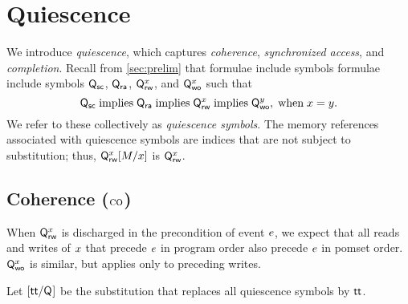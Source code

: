 \section{Quiescence}
\label{sec:q}

We introduce \emph{quiescence}, which captures \emph{coherence},
\emph{synchronized access}, and \emph{completion}.  Recall from
\textsection\ref{sec:prelim} that formulae include symbols formulae include
symbols $\mathsf{Q}_{{\mathsf{sc}}}$, $\mathsf{Q}_{{\mathsf{ra}}}$, $\mathsf{Q}_{\mathsf{rw}}^{x}$, and $\mathsf{Q}_{\mathsf{wo}}^{x}$ such that
\begin{displaymath}
  \mathsf{Q}_{{\mathsf{sc}}}\; \allowbreak\text{implies}\allowbreak\;\mathsf{Q}_{{\mathsf{ra}}}\; \allowbreak\text{implies}\allowbreak\;\mathsf{Q}_{\mathsf{rw}}^{x}\; \allowbreak\text{implies}\allowbreak\;\mathsf{Q}_{\mathsf{wo}}^{y}, \;\allowbreak\text{when}\allowbreak\; x=y.
\end{displaymath}
We refer to these collectively as \emph{quiescence symbols}.  The memory
references associated with quiescence symbols are indices that are not
subject to substitution; thus, $\mathsf{Q}_{\mathsf{rw}}^{x}[M/x]$ is $\mathsf{Q}_{\mathsf{rw}}^{x}$.


\subsection{Coherence (${\textsc{co}}$)}
\label{sec:co}



When $\mathsf{Q}_{\mathsf{rw}}^{x}$ is discharged in the precondition of event $e$, we
expect that all reads and writes of $x$ that precede $e$ in program
order also precede $e$ in pomset order.
$\mathsf{Q}_{\mathsf{wo}}^{x}$ is similar, but applies only to preceding writes.

\begin{definition}
  Let $[\mathsf{tt}/\mathsf{Q}_{}]$ be the substitution that replaces all quiescence
  symbols by $\mathsf{tt}$.
\end{definition}

